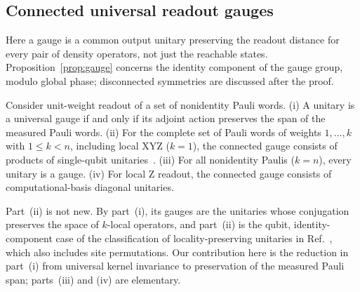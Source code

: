 \subsection{Connected universal readout gauges}
\label{sec:gaugeclass}
Here a gauge is a common output unitary preserving the readout distance
for every pair of density operators, not just the reachable states.
Proposition~\ref{prop:gauge} concerns the identity component of the
gauge group, modulo global phase; disconnected symmetries are discussed
after the proof.
\begin{proposition}\label{prop:gauge}
Consider unit-weight readout of a set of nonidentity Pauli words.
(i) A unitary is a universal gauge if and only if its adjoint action
preserves the span of the measured Pauli words.
(ii) For the complete set of Pauli words of weights $1,\ldots,k$ with
$1\le k<n$, including local XYZ ($k=1$), the connected gauge consists
of products of single-qubit unitaries~\cite[Sec.~4.2]{cpr2019locality}.
(iii) For all nonidentity Paulis ($k=n$), every unitary is a gauge.
(iv) For local Z readout, the connected gauge consists of
computational-basis diagonal unitaries.
\end{proposition}
Part~(ii) is not new. By part~(i), its gauges are the unitaries whose
conjugation preserves the space of $k$-local operators, and part~(ii)
is the qubit, identity-component case of the classification of
locality-preserving unitaries in Ref.~\cite[Sec.~4.2]{cpr2019locality},
which also includes site permutations. Our contribution here is the
reduction in part~(i) from universal kernel invariance to preservation
of the measured Pauli span; parts~(iii) and (iv) are elementary.
